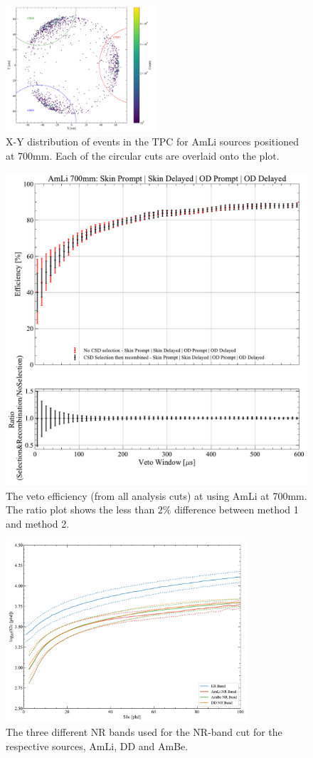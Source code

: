 \begin{figure}
            \centering
            \includegraphics[width=0.5\textwidth]{figures/VetoEfficiency/CircularCSDCut.pdf}
            \caption{X-Y distribution of events in the TPC for AmLi sources positioned at 700mm. Each of the circular cuts are overlaid onto the plot.}
            \label{fig:CSDSelection}
\end{figure}
\begin{figure}
        \centering
        \includegraphics[width=0.5\linewidth]{figures/VetoEfficiency/AmLi_700mm_Total_CSDSelection.pdf}
        \caption{The veto efficiency (from all analysis cuts) at using AmLi at 700mm. The ratio plot shows the less than $2\%$ difference between method 1 and method 2.}
        \label{fig:CSDSelectionEffComp}
\end{figure}
\begin{figure}
            \centering
            \includegraphics[width=0.8\textwidth]{figures/VetoEfficiency/SR3NRBands.pdf}
            \caption{The three different NR bands used for the NR-band cut for the respective sources, AmLi, DD and AmBe.}
            \label{fig:SR3NRBands}
\end{figure}
